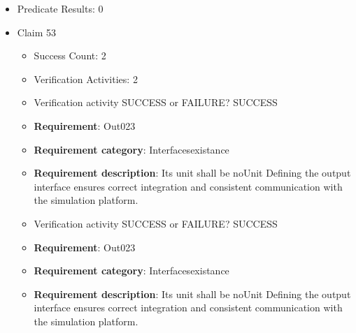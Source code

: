 \documentclass{article}
\begin{document}
\begin{itemize}
\begin{itemize}
						\item \textbf{Requirement}: Out022 
						\item \textbf{Requirement category}: Interfacesexistance 
						\item \textbf{Requirement description}: Its unit shall be Nm Defining the output interface ensures correct integration and consistent communication with the simulation platform.
					
					\item Verification activity SUCCESS or FAILURE? SUCCESS
		
						\item \textbf{Requirement}: Out022 
						\item \textbf{Requirement category}: Interfacesexistance 
						\item \textbf{Requirement description}: Its unit shall be Nm Defining the output interface ensures correct integration and consistent communication with the simulation platform.
					
				\end{itemize}
				
									    
				\item Predicate Results: 0

  				  \item Claim 53
				\begin{itemize}
			    	\item Success Count: 2 
			    	\item Verification Activities: 2
					\item Verification activity SUCCESS or FAILURE? SUCCESS
		
						\item \textbf{Requirement}: Out023 
						\item \textbf{Requirement category}: Interfacesexistance 
						\item \textbf{Requirement description}: Its unit shall be noUnit Defining the output interface ensures correct integration and consistent communication with the simulation platform.
					
					\item Verification activity SUCCESS or FAILURE? SUCCESS
		
						\item \textbf{Requirement}: Out023 
						\item \textbf{Requirement category}: Interfacesexistance 
						\item \textbf{Requirement description}: Its unit shall be noUnit Defining the output interface ensures correct integration and consistent communication with the simulation platform.
					

\end{itemize}
\end{itemize}
\end{document}
